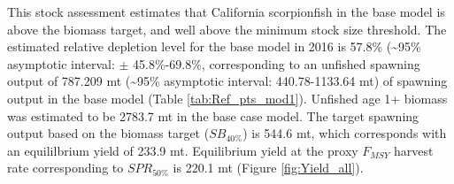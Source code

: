 \documentclass[12pt,]{article}
\begin{document}
This stock assessment estimates that California scorpionfish in the base
model is above the biomass target, and well above the minimum stock size
threshold. The estimated relative depletion level for the base model in
2016 is 57.8\% (\textasciitilde{}95\% asymptotic interval: \(\pm\)
45.8\%-69.8\%, corresponding to an unfished spawning output of 787.209
mt (\textasciitilde{}95\% asymptotic interval: 440.78-1133.64 mt) of
spawning output in the base model (Table \ref{tab:Ref_pts_mod1}).
Unfished age 1+ biomass was estimated to be 2783.7 mt in the base case
model. The target spawning output based on the biomass target
(\(SB_{40\%}\)) is 544.6 mt, which corresponds with an equililbrium
yield of 233.9 mt. Equilibrium yield at the proxy \(F_{MSY}\) harvest
rate corresponding to \(SPR_{50\%}\) is 220.1 mt (Figure
\ref{fig:Yield_all}).

\FloatBarrier
\end{document}
